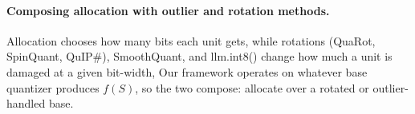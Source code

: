 

\paragraph{Composing allocation with outlier and rotation methods.} Allocation
chooses how many bits each unit gets, while rotations (QuaRot, SpinQuant, QuIP\#), SmoothQuant, and
llm.int8() change how much a unit is damaged at a given bit-width, 
Our framework operates on
whatever base quantizer produces $f(S)$, so the two compose: allocate over a rotated or outlier-handled
base. 

